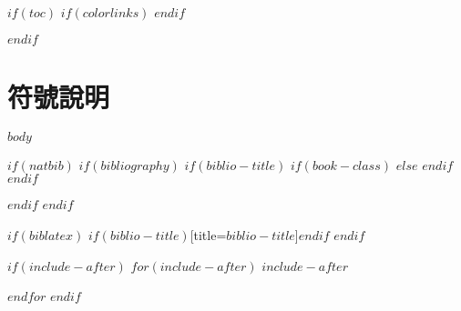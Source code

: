 \documentclass[$if(fontsize)$$fontsize$,$endif$$if(lang)$$babel-lang$,$endif$$if(papersize)$$papersize$paper,$endif$$for(classoption)$$classoption$$sep$,$endfor$]{$documentclass$}
\renewcommand{\chaptername}{}
\renewcommand{\thechapter}{第\zhnum{chapter}章}
\renewcommand{\thesection}{\arabic{chapter}.\arabic{section}}
\renewcommand{\thesubsection}{\arabic{chapter}.\arabic{section}.\arabic{subsection}}
\begin{document}
$if(toc)$
\begingroup
    \renewcommand{\contentsname}{\center 目錄 \addcontentsline{toc}{chapter}{目錄}}
    \renewcommand{\numberline}[1]{~#1\hspace*{1em}}
    $if(colorlinks)$
    \hypersetup{linkcolor=$if(toccolor)$$toccolor$$else$black$endif$}
    $endif$
    \setcounter{tocdepth}{$toc-depth$}
    \tableofcontents
    \newcommand{\lotlabel}{表}
    \renewcommand{\listtablename}{\center 表目錄 \addcontentsline{toc}{chapter}{表目錄}}
    \renewcommand{\numberline}[1]{\lotlabel~#1\hspace*{1em}}
    \listoftables
    \newcommand{\loflabel}{圖}
    \renewcommand{\listfigurename}{\center 圖目錄 \addcontentsline{toc}{chapter}{圖目錄}}
    \renewcommand{\numberline}[1]{\loflabel~#1\hspace*{1em}}
    \listoffigures
\endgroup
$endif$

\chapter*{符號說明}
\fontsize{14}{21}\selectfont{$symbols$}

\mainmatter
$body$

$if(natbib)$
$if(bibliography)$
    \renewcommand{\chaptername}{}
    \renewcommand{\thechapter}{}
    $if(biblio-title)$
        $if(book-class)$
        \renewcommand\bibname{$biblio-title$}
        $else$
        \renewcommand\refname{$biblio-title$}
        $endif$
    $endif$
    
$endif$
$endif$

$if(biblatex)$
\printbibliography$if(biblio-title)$[title=$biblio-title$]$endif$
$endif$


$if(include-after)$
\setcounter{appendix_counter}{1}
\renewcommand{\thechapter}{附錄\zhnum{appendix_counter}}
\renewcommand{\thesection}{\arabic{section}.}
\renewcommand{\thesubsection}{\arabic{section}-\arabic{subsection}}
$for(include-after)$
\newpage
$include-after$
\addtocounter{appendix_counter}{1}
$endfor$
$endif$

\end{document}
